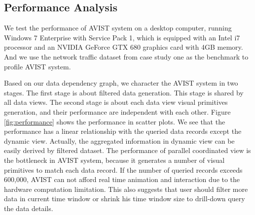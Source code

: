 \documentclass[journal]{vgtc}                %
\begin{document}
{%
\subsection{Performance Analysis}

We test the performance of AVIST system on a desktop computer, running Windows 7 Enterprise with Service Pack 1, which is equipped with an Intel i7 processor and an NVIDIA GeForce GTX 680 graphics card with 4GB memory. And we use the network traffic dataset from case study one as the benchmark to profile AVIST system.  



Based on our data dependency graph, we character the AVIST system in two stages. The first stage is about filtered data generation. This stage is shared by all data views. The second stage is about each data view visual primitives generation, and their performance are independent with each other. Figure \ref{fig:performance} shows the performance in scatter plots. We see that the performance has a linear relationship with the queried data records except the dynamic view. Actually, the aggregated information in dynamic view can be easily derived by filtered dataset. The performance of parallel coordinated view is the bottleneck in AVIST system, because it generates a number of visual primitives to match each data record. If the number of queried records exceeds 600,000, AVIST can not afford real time animation and interaction due to the hardware computation limitation. This also suggests that user should filter more data in current time window or shrink his time window size to drill-down query the data details.

}
\end{document}
